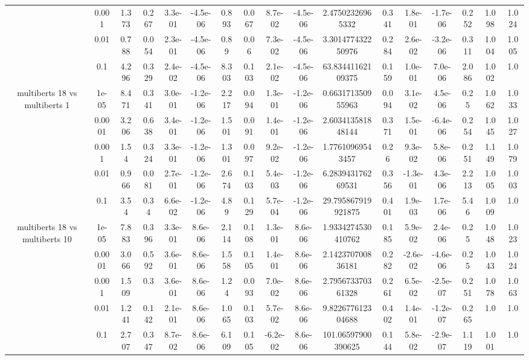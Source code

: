 \begin{tabular}{|c|c|c|c|c|c|c|c|c|c|c|c|c|c|c|c|c|}
 & 0.001 & 1.373 & 0.267 & 3.3e-01 & -4.5e-06 & 0.893 & 0.067 & 8.7e-02 & -4.5e-06 & 2.47502326965332 & 0.341 & 1.8e-01 & -1.7e-06 & 0.252 & 1.098 & 1.024 \\
 & 0.01 & 0.788 & 0.054 & 2.3e-01 & -4.5e-06 & 0.89 & 0.06 & 7.3e-02 & -4.5e-06 & 3.301477432250976 & 0.284 & 2.6e-02 & -3.2e-06 & 0.311 & 1.004 & 1.005 \\
 & 0.1 & 4.296 & 0.329 & 2.4e-02 & -4.5e-06 & 8.303 & 0.103 & 2.1e-02 & -4.5e-06 & 63.83441162109375 & 0.159 & 1.0e-01 & 7.0e-06 & 2.086 & 1.002 & 1.0 \\
\hline
\multirow{5}{*}{multiberts 18 vs multiberts 1} & 1e-05 & 8.471 & 0.341 & 3.0e-01 & -1.2e-06 & 2.217 & 0.094 & 1.3e-01 & -1.2e-06 & 0.663171350955963 & 0.094 & 3.1e-02 & 4.5e-06 & 0.25 & 1.062 & 1.033 \\
 & 0.0001 & 3.206 & 0.638 & 3.4e-01 & -1.2e-06 & 1.501 & 0.091 & 1.4e-01 & -1.2e-06 & 2.603413581848144 & 0.371 & 1.5e-01 & -6.4e-06 & 0.254 & 1.045 & 1.027 \\
 & 0.001 & 1.54 & 0.324 & 3.3e-01 & -1.2e-06 & 1.301 & 0.097 & 9.2e-02 & -1.2e-06 & 1.77610969543457 & 0.26 & 9.3e-02 & 5.8e-06 & 0.251 & 1.149 & 1.079 \\
 & 0.01 & 0.966 & 0.081 & 2.7e-01 & -1.2e-06 & 2.674 & 0.103 & 5.4e-03 & -1.2e-06 & 6.283943176269531 & 0.356 & -1.3e-01 & 4.3e-06 & 2.213 & 1.005 & 1.003 \\
 & 0.1 & 3.54 & 0.34 & 6.6e-02 & -1.2e-06 & 4.89 & 0.129 & 5.7e-04 & -1.2e-06 & 29.795867919921875 & 0.401 & 1.9e-03 & 1.7e-06 & 5.46 & 1.009 & 1.0 \\
\hline
\multirow{5}{*}{multiberts 18 vs multiberts 10} & 1e-05 & 7.883 & 0.396 & 3.3e-01 & 8.6e-06 & 2.114 & 0.108 & 1.3e-01 & 8.6e-06 & 1.9334274530410762 & 0.185 & 5.9e-02 & 2.4e-06 & 0.25 & 1.048 & 1.023 \\
 & 0.0001 & 3.066 & 0.592 & 3.6e-01 & 8.6e-06 & 1.558 & 0.105 & 1.4e-01 & 8.6e-06 & 2.142370700836181 & 0.282 & -2.6e-02 & -4.6e-06 & 0.25 & 1.043 & 1.024 \\
 & 0.001 & 1.509 & 0.3 & 3.6e-01 & 8.6e-06 & 1.24 & 0.093 & 7.0e-02 & 8.6e-06 & 2.795673370361328 & 0.261 & 6.5e-02 & -2.5e-07 & 0.251 & 1.078 & 1.063 \\
 & 0.01 & 1.241 & 0.142 & 2.1e-01 & 8.6e-06 & 1.065 & 0.103 & 5.7e-02 & 8.6e-06 & 9.822677612304688 & 0.402 & 1.4e-01 & -1.2e-07 & 0.265 & 1.0 & 1.0 \\
 & 0.1 & 2.707 & 0.347 & 8.7e-02 & 8.6e-06 & 6.109 & 0.105 & -6.2e-02 & 8.6e-06 & 101.06597900390625 & 0.144 & 5.8e-02 & -2.9e-07 & 1.119 & 1.001 & 1.0 \\

\end{tabular}
